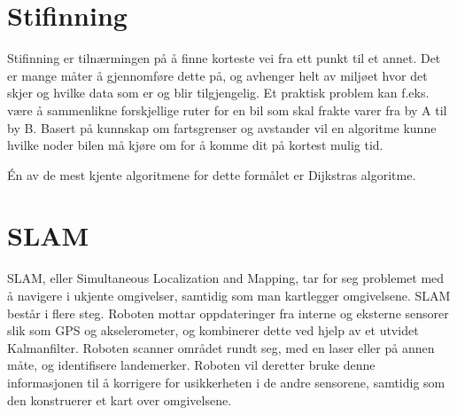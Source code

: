 \section{Stifinning}

Stifinning er tilnærmingen på å finne korteste vei fra ett punkt til et annet. Det er mange måter å gjennomføre dette på, og avhenger helt av miljøet hvor det skjer og hvilke data som er og blir tilgjengelig. Et praktisk problem kan f.eks. være å sammenlikne forskjellige ruter for en bil som skal frakte varer fra by A til by B. Basert på kunnskap om fartsgrenser og avstander vil en algoritme kunne hvilke noder bilen må kjøre om for å komme dit på kortest mulig tid.

Én av de mest kjente algoritmene for dette formålet er Dijkstras algoritme. 



\section{SLAM}

SLAM, eller Simultaneous Localization and Mapping, tar for seg problemet med å navigere i ukjente omgivelser, samtidig som man kartlegger omgivelsene. SLAM består i flere steg. Roboten mottar oppdateringer fra interne og eksterne sensorer slik som GPS og akselerometer, og kombinerer dette ved hjelp av et utvidet Kalmanfilter. Roboten scanner området rundt seg, med en laser eller på annen måte, og identifisere landemerker. Roboten vil deretter bruke denne informasjonen til å korrigere for usikkerheten i de andre sensorene, samtidig som den konstruerer et kart over omgivelsene. \cite{slam_for_dummies}